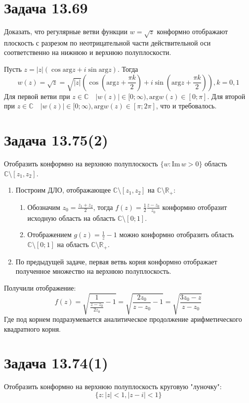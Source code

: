 \documentclass[11pt]{article}
\begin{document}
\section{Задача 13.69}
\label{sec:orga23cec2}
Доказать, что регулярные ветви функции \(w = \sqrt z\) конформно отображают плоскость  с разрезом по
неотрицательной части действительной оси соответственно на нижнюю и верхнюю полуплоскости.

Пусть \(z = |z|(\cos\mathrm{arg}z + i\sin\mathrm{arg}z)\). Тогда
$$w(z) = \sqrt z = \sqrt{|z|}\left(\cos\left(\mathrm{arg} z + \frac{\pi k}2\right) + i\sin\left(\mathrm{arg} z + \frac{\pi k}2\right)\right), k = 0, 1$$
Для первой ветви при \(z \in \mathbb{C}\quad |w(z)| \in [0; \infty), \mathrm{arg} w(z) \in [0; \pi]\). Для второй при
\(z \in \mathbb{C}\quad |w(z)| \in [0; \infty), \mathrm{arg} w(z) \in [\pi; 2\pi]\), что и требовалось.
\section{Задача 13.75(2)}
\label{sec:orgce0f483}
Отобразить конформно на верхнюю полуплоскость \(\{w: \mathrm{Im}\,w > 0\}\) область \(\mathbb{C} \setminus [z_1, z_2]\).

\begin{enumerate}
\item Построим ДЛО, отображающее \(\mathbb{C} \setminus [z_1, z_2]\) на \(\mathbb{C} \setminus \mathbb{R}_+\):
\begin{enumerate}
\item Обозначим \(z_0 = \frac{z_1 + z_2}2\), тогда \(f(z) = \frac{1}2\frac{z - z_0}{z_0}\) конформно отобразит исходную область на область \(\mathbb{C} \setminus [0; 1]\).
\item Отображением \(g(z) = \frac{1}z - 1\) можно конформно отобразить область \(\mathbb{C} \setminus [0; 1]\) на область \(\mathbb{C} \setminus \mathbb{R}_+\).
\end{enumerate}
\item По предыдущей задаче, первая ветвь корня конформно отображает полученное множество на верхнюю полуплоскость.
\end{enumerate}

Получили отображение:
$$f(z) = \sqrt{\frac{1}{\frac{z - z_0}{2z_0}} - 1} = \sqrt{\frac{2z_0}{z - z_0} - 1} = \sqrt{\frac{3z_0 - z}{z - z_0}}$$
Где под корнем подразумевается аналитическое продолжение арифметического квадратного корня.
\section{Задача 13.74(1)}
\label{sec:org9e4a84d}
Отобразить конформно на верхнюю полуплоскость круговую "луночку":
$$\{z: |z| < 1, |z - i| < 1\}$$
\end{document}
